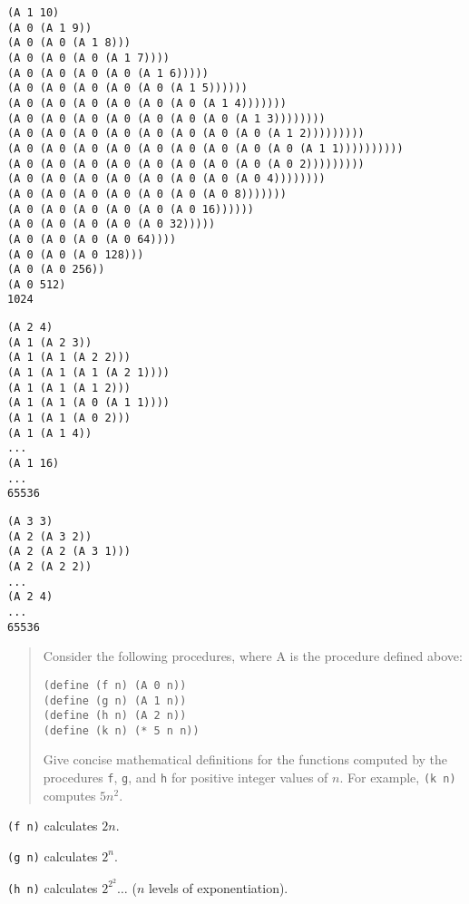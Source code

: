 \documentclass{article}
\begin{document}
\begin{minipage}{\linewidth}
\begin{verbatim}
(A 1 10)
(A 0 (A 1 9))
(A 0 (A 0 (A 1 8)))
(A 0 (A 0 (A 0 (A 1 7))))
(A 0 (A 0 (A 0 (A 0 (A 1 6)))))
(A 0 (A 0 (A 0 (A 0 (A 0 (A 1 5))))))
(A 0 (A 0 (A 0 (A 0 (A 0 (A 0 (A 1 4)))))))
(A 0 (A 0 (A 0 (A 0 (A 0 (A 0 (A 0 (A 1 3))))))))
(A 0 (A 0 (A 0 (A 0 (A 0 (A 0 (A 0 (A 0 (A 1 2)))))))))
(A 0 (A 0 (A 0 (A 0 (A 0 (A 0 (A 0 (A 0 (A 0 (A 1 1))))))))))
(A 0 (A 0 (A 0 (A 0 (A 0 (A 0 (A 0 (A 0 (A 0 2)))))))))
(A 0 (A 0 (A 0 (A 0 (A 0 (A 0 (A 0 (A 0 4))))))))
(A 0 (A 0 (A 0 (A 0 (A 0 (A 0 (A 0 8)))))))
(A 0 (A 0 (A 0 (A 0 (A 0 (A 0 16))))))
(A 0 (A 0 (A 0 (A 0 (A 0 32)))))
(A 0 (A 0 (A 0 (A 0 64))))
(A 0 (A 0 (A 0 128)))
(A 0 (A 0 256))
(A 0 512)
1024
\end{verbatim}
\end{minipage}
\vspace{\baselineskip}

\begin{minipage}{\linewidth}
\begin{verbatim}
(A 2 4)
(A 1 (A 2 3))
(A 1 (A 1 (A 2 2)))
(A 1 (A 1 (A 1 (A 2 1))))
(A 1 (A 1 (A 1 2)))
(A 1 (A 1 (A 0 (A 1 1))))
(A 1 (A 1 (A 0 2)))
(A 1 (A 1 4))
...
(A 1 16)
...
65536
\end{verbatim}
\end{minipage}
\vspace{\baselineskip}

\begin{minipage}{\linewidth}
\begin{verbatim}
(A 3 3)
(A 2 (A 3 2))
(A 2 (A 2 (A 3 1)))
(A 2 (A 2 2))
...
(A 2 4)
...
65536
\end{verbatim}
\end{minipage}
\vspace{\baselineskip}

\begin{quote}
    Consider the following procedures, where A is the procedure defined above:

    \begin{lstlisting}
(define (f n) (A 0 n))
(define (g n) (A 1 n))
(define (h n) (A 2 n))
(define (k n) (* 5 n n))
    \end{lstlisting}

    Give concise mathematical definitions for the functions computed by the
    procedures \verb|f|, \verb|g|, and \verb|h| for positive integer values of
    $n $. For example, \verb|(k n)| computes $5n^2$.
\end{quote}

\verb|(f n)| calculates $2n$.

\verb|(g n)| calculates $2^n$.

\verb|(h n)| calculates $2^{2^2}\ldots$ ($n$ levels of exponentiation).
\end{document}

